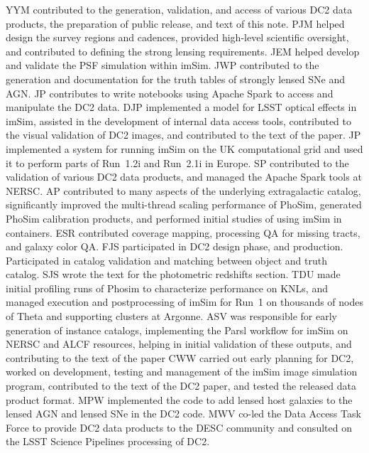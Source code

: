 \documentclass[modern]{descnote}
\begin{document}
YYM contributed to the generation, validation, and access of various DC2 data products, the preparation of public release, and text of this note.
%
PJM helped design the survey regions and cadences, provided high-level scientific oversight, and contributed to defining the strong lensing requirements.
%
JEM helped develop and validate the PSF simulation within imSim.
%
JWP contributed to the generation and documentation for the truth tables of strongly lensed SNe and AGN.
%
JP contributes to write notebooks using Apache Spark to access and manipulate the DC2 data.
%
DJP implemented a model for LSST optical effects in imSim, assisted in the development of internal data access tools, contributed to the visual validation of DC2 images, and contributed to the text of the paper.
%
JP implemented a system for running imSim on the UK computational grid and used it to perform parts of Run~1.2i and Run~2.1i in Europe.
%
SP contributed to the validation of various DC2 data products, and managed the Apache Spark tools at NERSC.
%
AP contributed to many aspects of the underlying extragalactic catalog, significantly improved the multi-thread scaling performance of PhoSim, generated PhoSim calibration products, and performed initial studies of using imSim in containers.
%
ESR contributed coverage mapping, processing QA for missing tracts, and galaxy color QA.
%
FJS participated in DC2 design phase, and production. Participated in catalog validation and matching between object and truth catalog.
%
SJS wrote the text for the photometric redshifts section.
%
TDU made initial profiling runs of Phosim to characterize performance on KNLs, and managed execution and postprocessing of imSim for Run~1  on thousands of nodes of Theta and supporting clusters at Argonne.
ASV was responsible for early generation of instance catalogs, implementing the Parsl workflow for imSim on NERSC and ALCF resources, helping in initial validation of these outputs, and contributing to the text of the paper
%
CWW carried out early planning for DC2, worked on development, testing and management of the imSim image simulation program, contributed to the text of the DC2 paper, and tested the released data product format.
%
MPW implemented the code to add lensed host galaxies to the lensed AGN and lensed SNe in the DC2 code.
%
MWV co-led the Data Access Task Force to provide DC2 data products to the DESC community and consulted on the LSST Science Pipelines processing of DC2.
%

\clearpage
{}
{}



\end{document}
